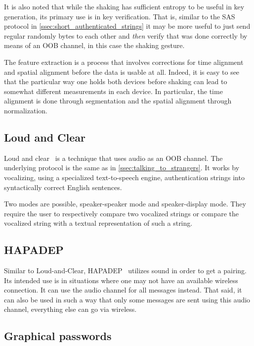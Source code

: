 \documentclass[conference, 11pt]{sty/IEEEtran}
\begin{document}
It is also noted that while the shaking has sufficient entropy to be useful in key generation, its primary use is in key verification.
That is, similar to the SAS protocol in \autoref{ssec:short_authenticated_strings} it may be more useful to just send regular randomly bytes to each other and \emph{then} verify that was done correctly by means of an OOB channel, in this case the shaking gesture.

The feature extraction is a process that involves corrections for time alignment and spatial alignment before the data is usable at all.
Indeed, it is easy to see that the particular way one holds both devices before shaking can lead to somewhat different measurements in each device.
In particular, the time alignment is done through segmentation and the spatial alignment through normalization.

\subsection{Loud and Clear}
\label{ssec:loud_and_clear}

Loud and clear~\cite{goodrich2006loud} is a technique that uses audio as an OOB channel.
The underlying protocol is the same as in \autoref{ssec:talking_to_strangers}.
It works by vocalizing, using a specialized text-to-speech engine, authentication strings into syntactically correct English sentences.

Two modes are possible, speaker-speaker mode and speaker-display mode.
They require the user to respectively compare two vocalized strings or compare the vocalized string with a textual representation of such a string.

\subsection{HAPADEP}
\label{ssec:hapadep}

Similar to Loud-and-Clear, HAPADEP~\cite{soriente2008hapadep} utilizes sound in order to get a pairing.
Its intended use is in situations where one may not have an available wireless connection.
It can use the audio channel for all messages instead.
That said, it can also be used in such a way that only some messages are sent using this audio channel, everything else can go via wireless.


\subsection{Graphical passwords}
\label{ssec:graphical_passwords}
\end{document}
